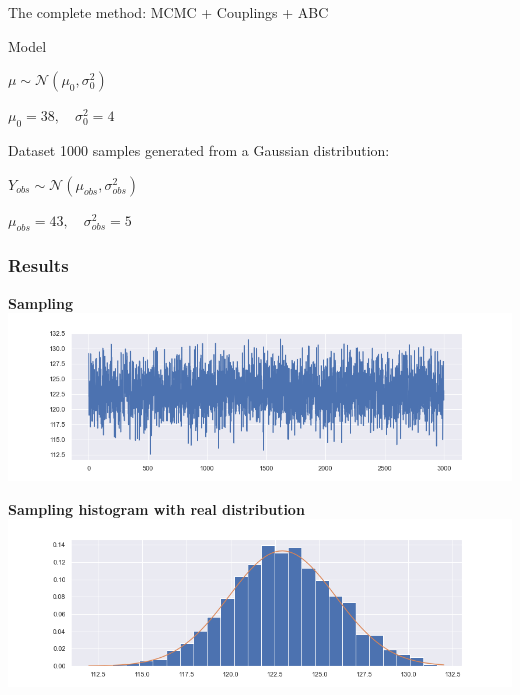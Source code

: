 \documentclass{beamer}
\begin{document}
\begin{section}{The complete method: MCMC + Couplings + ABC}
\begin{frame}
{\begin{block}{Model}
\begin{center}
					\vspace{0.3cm}
					
					$ \mu  \sim \mathcal{N}(\mu_0, \sigma_0^2)$
					
					$\mu_0 = 38, \quad \sigma^2_0 = 4$
				\end{center}
			\end{block}
			
			\begin{block}{Dataset}
				1000 samples generated from a Gaussian distribution:
				\begin{center}
					$
					Y_{obs} \sim \mathcal{N}(\mu_{obs}, \sigma_{obs} ^2)
					$
					
					$
					\mu_{obs} = 43, \quad
					\sigma_{obs} ^2 = 5
					$
				\end{center}
			\end{block}
		}
	\end{frame}



	\begin{frame}
		\frametitle{Results}
		\begin{center}
			\begin{minipage}{0.63\textwidth}
				\begin{center}
					{\scriptsize \textbf{Sampling}}
					\includegraphics[width=\textwidth]{img/mcmc_couplings_abc_sampling}
				\end{center}
			\end{minipage}
			
			\vspace{0.2cm}
			
			\begin{minipage}{0.63\textwidth}
				\begin{center}
					{\scriptsize \textbf{Sampling histogram with real distribution}}
					\includegraphics[width=\textwidth]{img/mcmc_couplings_abc_histogram}
				\end{center}
			\end{minipage}
		\end{center}
	\end{frame}


\end{section}
\end{document}
